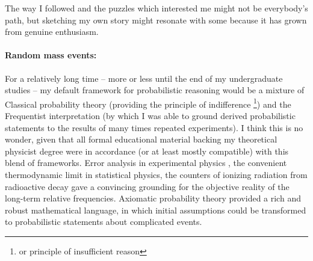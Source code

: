 \documentclass{article}
\theoremstyle{definition}
\begin{document}
The way I followed and the puzzles which interested me might not be everybody's path, but sketching my own story might resonate with some because it has grown from genuine enthusiasm. 

\paragraph{Random mass events:}

For a relatively long time -- more or less until the end of my undergraduate studies -- my default framework for probabilistic reasoning would be a mixture of Classical probability theory (providing the principle of indifference \footnote{or principle of insufficient reason}) and the Frequentist interpretation (by which I was able to ground derived probabilistic statements to the results of many times repeated experiments).
I think this is no wonder, given that all formal educational material backing my theoretical physicist degree were in accordance (or at least mostly compatible) with this blend of frameworks.
Error analysis in experimental physics \cite{book:ErrorAnalysis,book:ExperimentationBaird}, the convenient thermodynamic limit in statistical physics, the counters of ionizing radiation from radioactive decay gave a convincing grounding for the objective reality of the long-term relative frequencies. Axiomatic probability theory \cite{book:Kolmogorov} provided a rich and robust mathematical language, in which initial assumptions could be transformed to probabilistic statements about complicated events.
\end{document}
